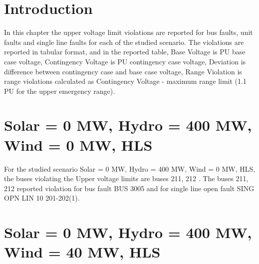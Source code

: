 \documentclass[10pt]{report}
\begin{document}
\section{Introduction}
In this chapter the upper voltage limit violations are reported for bus faults, unit faults and single line faults for each of the studied scenario.
The violations are reported in tabular format, and in the reported table, Base Voltage is PU base case voltage, Contingency Voltage is PU contingency case voltage, Deviation is difference between contingency case and base case voltage, Range Violation is range violations calculated as Contingency Voltage - maximum range limit (1.1 PU for the upper emergency range).

\section{Solar = 0 MW, Hydro = 400 MW, Wind = 0 MW, HLS}

For the studied scenario Solar = 0 MW, Hydro = 400 MW, Wind = 0 MW, HLS, the buses violating the Upper voltage limits are buses 211, 212 .
The buses 211, 212 reported violation for bus fault BUS 3005 and for single line open fault SING OPN LIN   10 201-202(1).
\begin{table}[H]
\caption{Contingencies reporting bus voltages greater than emergency voltage of 1.1 PU for scenario Solar = 0 MW, Hydro = 400 MW, Wind = 0 MW, HLS}
\label{HVSolar0MWHydro400MWWind0MWHLS}
\centering
{}
\end{table}

\section{Solar = 0 MW, Hydro = 400 MW, Wind = 40 MW, HLS}
\end{document}
